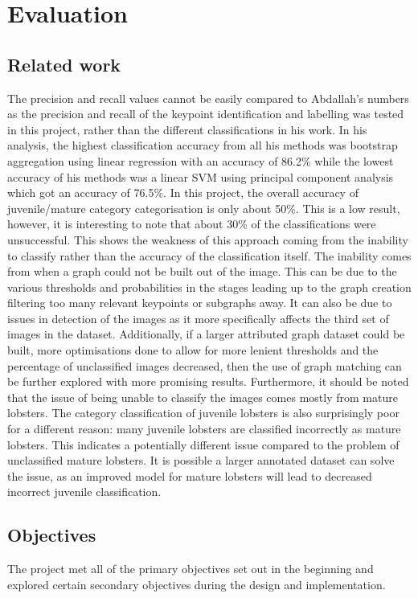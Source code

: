 \section{Evaluation}\label{sec:evaluation}

\subsection{Related work}
The precision and recall values cannot be easily compared to Abdallah's numbers \cite{lobster-thesis} as the precision and recall of the keypoint identification and labelling was tested in this project, rather than the different classifications in his work. In his analysis, the highest classification accuracy from all his methods was bootstrap aggregation using linear regression with an accuracy of 86.2\% while the lowest accuracy of his methods was a linear SVM using principal component analysis which got an accuracy of 76.5\%. 
\n
In this project, the overall accuracy of juvenile/mature category categorisation is only about 50\%. This is a low result, however, it is interesting to note that about 30\% of the classifications were unsuccessful. This shows the weakness of this approach coming from the inability to classify rather than the accuracy of the classification itself. The inability comes from when a graph could not be built out of the image. This can be due to the various thresholds and probabilities in the stages leading up to the graph creation filtering too many relevant keypoints or subgraphs away. It can also be due to issues in detection of the images as it more specifically affects the third set of images in the dataset. Additionally, if a larger attributed graph dataset could be built, more optimisations done to allow for more lenient thresholds and the percentage of unclassified images decreased, then the use of graph matching can be further explored with more promising results. Furthermore, it should be noted that the issue of being unable to classify the images comes mostly from mature lobsters.
\n
The category classification of juvenile lobsters is also surprisingly poor for a different reason: many juvenile lobsters are classified incorrectly as mature lobsters. This indicates a potentially different issue compared to the problem of unclassified mature lobsters. It is possible a larger annotated dataset can solve the issue, as an improved model for mature lobsters will lead to decreased incorrect juvenile classification. 

\subsection{Objectives}
The project met all of the primary objectives set out in the beginning and explored certain secondary objectives during the design and implementation. 
